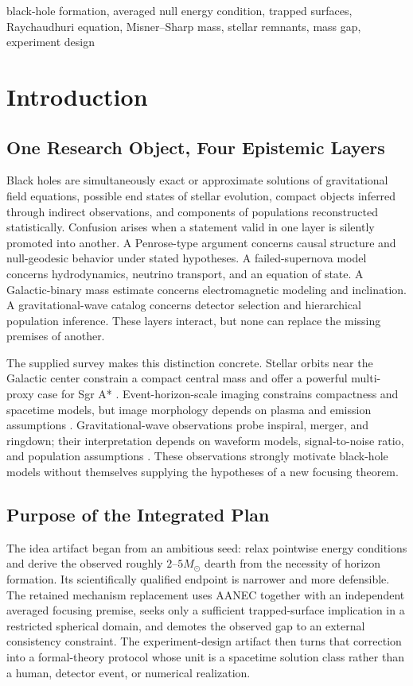 \documentclass[conference]{IEEEtran}
\newcommand{\Msun}{M_{\odot}}
\begin{document}
\begin{IEEEkeywords}
black-hole formation, averaged null energy condition, trapped surfaces, Raychaudhuri equation, Misner--Sharp mass, stellar remnants, mass gap, experiment design
\end{IEEEkeywords}

\section{Introduction}
\label{sec:introduction}

\subsection{One Research Object, Four Epistemic Layers}
Black holes are simultaneously exact or approximate solutions of gravitational field equations, possible end states of stellar evolution, compact objects inferred through indirect observations, and components of populations reconstructed statistically. Confusion arises when a statement valid in one layer is silently promoted into another. A Penrose-type argument concerns causal structure and null-geodesic behavior under stated hypotheses. A failed-supernova model concerns hydrodynamics, neutrino transport, and an equation of state. A Galactic-binary mass estimate concerns electromagnetic modeling and inclination. A gravitational-wave catalog concerns detector selection and hierarchical population inference. These layers interact, but none can replace the missing premises of another.

The supplied survey makes this distinction concrete. Stellar orbits near the Galactic center constrain a compact central mass and offer a powerful multi-proxy case for Sgr A* \cite{genzel2010}. Event-horizon-scale imaging constrains compactness and spacetime models, but image morphology depends on plasma and emission assumptions \cite{kocherlakota2021}. Gravitational-wave observations probe inspiral, merger, and ringdown; their interpretation depends on waveform models, signal-to-noise ratio, and population assumptions \cite{berti2015,yunes2016}. These observations strongly motivate black-hole models without themselves supplying the hypotheses of a new focusing theorem.

\subsection{Purpose of the Integrated Plan}
The idea artifact began from an ambitious seed: relax pointwise energy conditions and derive the observed roughly $2$--$5\Msun$ dearth from the necessity of horizon formation. Its scientifically qualified endpoint is narrower and more defensible. The retained mechanism replacement uses AANEC together with an independent averaged focusing premise, seeks only a sufficient trapped-surface implication in a restricted spherical domain, and demotes the observed gap to an external consistency constraint. The experiment-design artifact then turns that correction into a formal-theory protocol whose unit is a spacetime solution class rather than a human, detector event, or numerical realization.
\end{document}
